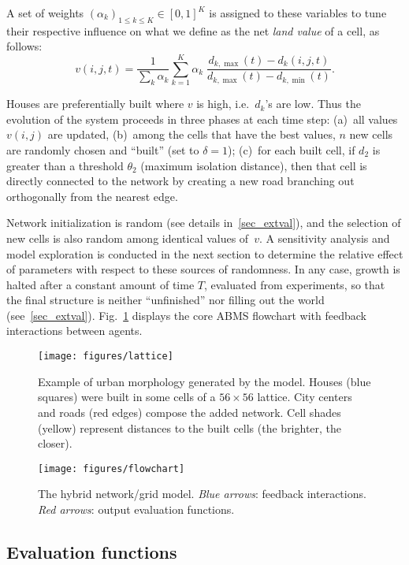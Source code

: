 A set of weights $(\alpha_k)_{1\leq k\leq K}\in[0,1]^K$ is assigned to these variables to tune their respective influence on what we define as the net \emph{land value} of a cell, as follows:
%
\begin{equation}
v(i,j,t)=\frac{1}{\sum_k \alpha_k}\sum_{k=1}^K \alpha_k\;\frac{d_{k,\max}(t)-d_k(i,j,t)}{d_{k,\max}(t)-d_{k,\min}(t)}.
\end{equation}

\noindent Houses are preferentially built where $v$ is high, i.e.~$d_k$'s are low. Thus the evolution of the system proceeds in three phases at each time step: (a)~all values $v(i,j)$ are updated, (b)~among the cells that have the best values, $n$ new cells are randomly chosen and ``built'' (set to $\delta=1$); (c)~for each built cell, if $d_2$ is greater than a threshold $\theta_2$ (maximum isolation distance), then that cell is directly connected to the network by creating a new road branching out orthogonally from the nearest edge.

Network initialization is random (see details in~\ref{sec_extval}), and the selection of new cells is also random among identical values of~$v$. A sensitivity analysis and model exploration is conducted in the next section to determine the relative effect of parameters with respect to these sources of randomness. In any case, growth is halted after a constant amount of time $T$, evaluated from experiments, so that the final structure is neither ``unfinished'' nor filling out the world (see~\ref{sec_extval}). Fig.~\ref{fig_flowchart} displays the core ABMS flowchart with feedback interactions between agents.

\begin{figure}[t]
\centering
\texttt{[image: figures/lattice]}
\caption{\small Example of urban morphology generated by the model. Houses (blue squares) were built in some cells of a $56\times 56$ lattice. City centers and roads (red edges) compose the added network. Cell shades (yellow) represent distances to the built cells (the brighter, the closer).}
\label{fig_lattice}
\vspace{0.5cm}
\texttt{[image: figures/flowchart]}
\caption{\small The hybrid network/grid model. \emph{Blue arrows}: feedback interactions. \emph{Red arrows}: output evaluation functions.}
\label{fig_flowchart}
\end{figure}

\subsection{Evaluation functions}

